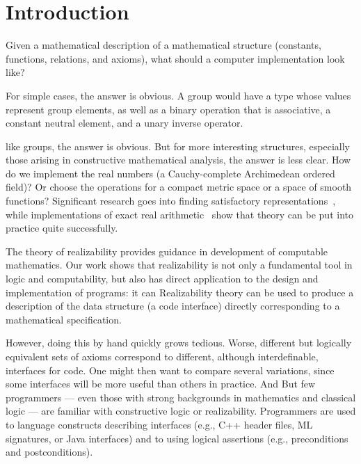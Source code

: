 \section{Introduction}
\label{sec:introduction}

Given a mathematical description of a mathematical structure (constants,
functions, relations, and axioms), what should a computer
implementation look like?

For simple cases,
\iflong
the answer is obvious. A
group would have a type whose values represent group elements, as well
as a binary operation that is associative, a constant 
neutral element, and a unary inverse operator.

\else %
like groups, the answer is obvious.
\fi %
%
But for more interesting structures, especially those arising in
constructive mathematical analysis, the answer is less clear. How do we
implement the real numbers (a Cauchy-complete Archimedean ordered
field)? Or choose the operations for a compact metric
space or a space of smooth functions? Significant research goes into
finding satisfactory representations~\cite{Wei00,TZ98,Bla97,edalat04:_domain_theor_differ_calcul_funct}, while
implementations of exact real arithmetic~\cite{muller01,Lam05a} show that
theory can be put into practice quite successfully.

\iflong
The theory of realizability provides guidance in development of
computable mathematics.  Our work shows that realizability is
not only  a
fundamental tool in logic and computability, but also
has direct application to the design and implementation of programs:
it can
\else %
Realizability theory can be used to 
\fi %
produce a description of the data structure (a code interface)
directly corresponding to a mathematical specification.
%
\iflong

\fi %
%
\iflong
However, doing this by hand quickly grows tedious. 
Worse, different
but logically equivalent sets of axioms correspond to different,
although interdefinable, interfaces for code. One might then want to
compare several variations, since some interfaces will be more useful
than others in practice.
And 
\else
But
\fi %
few programmers --- even those with strong backgrounds in
mathematics and classical logic --- are familiar with constructive logic or
realizability. 
\iflong
Programmers are used to language constructs
describing interfaces (e.g., C++ header files, ML signatures, or Java
interfaces) and to using logical assertions (e.g., preconditions
and postconditions).
\fi


